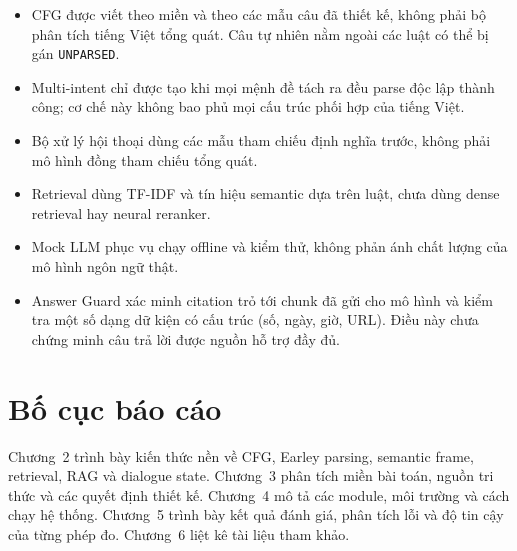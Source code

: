 \begin{itemize}
  \item CFG được viết theo miền và theo các mẫu câu đã thiết kế, không phải bộ phân tích tiếng Việt tổng quát. Câu tự nhiên nằm ngoài các luật có thể bị gán \texttt{UNPARSED}.
  \item Multi-intent chỉ được tạo khi mọi mệnh đề tách ra đều parse độc lập thành công; cơ chế này không bao phủ mọi cấu trúc phối hợp của tiếng Việt.
  \item Bộ xử lý hội thoại dùng các mẫu tham chiếu định nghĩa trước, không phải mô hình đồng tham chiếu tổng quát.
  \item Retrieval dùng TF-IDF và tín hiệu semantic dựa trên luật, chưa dùng dense retrieval hay neural reranker.
  \item Mock LLM phục vụ chạy offline và kiểm thử, không phản ánh chất lượng của mô hình ngôn ngữ thật.
  \item Answer Guard xác minh citation trỏ tới chunk đã gửi cho mô hình và kiểm tra một số dạng dữ kiện có cấu trúc (số, ngày, giờ, URL). Điều này chưa chứng minh câu trả lời được nguồn hỗ trợ đầy đủ.
\end{itemize}

\section{Bố cục báo cáo}

Chương~2 trình bày kiến thức nền về CFG, Earley parsing, semantic frame, retrieval, RAG và dialogue state. Chương~3 phân tích miền bài toán, nguồn tri thức và các quyết định thiết kế. Chương~4 mô tả các module, môi trường và cách chạy hệ thống. Chương~5 trình bày kết quả đánh giá, phân tích lỗi và độ tin cậy của từng phép đo. Chương~6 liệt kê tài liệu tham khảo.
